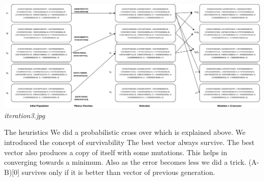 \documentclass[11pt]{article}
\begin{document}
	  \begin{center}
		\includegraphics[width=\linewidth]{iteration3.jpg}
		\\
		\textit{iteration3.jpg}
	  \end{center}
	  The heuristics
	  We did a probabilistic cross over which is
	  explained above.
	  We introduced the concept of
	  survivability
	  The best vector always survive.
	  The best vector also produces a copy of
	  itself with some mutations.
	  This helps in converging towards a
	  minimum.
	  Also as the error becomes less we did a
	  trick.
	  (A-B)[0] survives only if it is better
	  than vector of previous generation.
\end{document}
